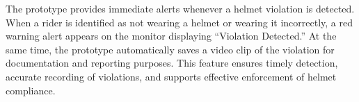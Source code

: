 \begin{refsection}
\noindent
The prototype provides immediate alerts whenever a helmet violation is detected. When a rider is identified as not wearing a helmet or wearing it incorrectly, a red warning alert appears on the monitor displaying “Violation Detected.” At the same time, the prototype  automatically saves a video clip of the violation for documentation and reporting purposes. This feature ensures timely detection, accurate recording of violations, and supports effective enforcement of helmet compliance.







\clearpage

\printbibliography[heading=subbibintoc, title={\texorpdfstring{\centering}{} Notes}]
\end{refsection}

